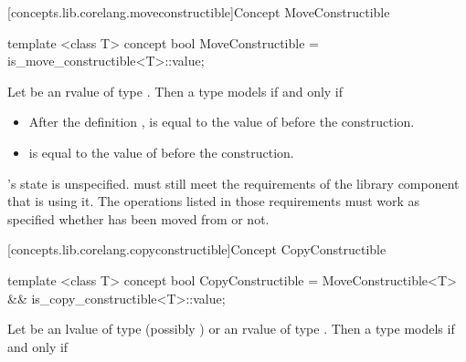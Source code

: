 \begin{addedblock}
\begin{itemdescr}
\end{itemdescr}

[concepts.lib.corelang.moveconstructible]{Concept MoveConstructible}

%
\begin{itemdecl}
template <class T>
concept bool MoveConstructible =
  is_move_constructible<T>::value;
\end{itemdecl}

\begin{itemdescr}
\pnum
Let  be an rvalue of type . Then a type  models
 if and only if

\begin{itemize}
\item After the definition ,  is equal to the value of
 before the construction.
\item {} is equal to the value of  before the construction.
\end{itemize}

\pnum
{}'s state is unspecified. \enternote {} must still meet the
requirements of the library component that is using it. The operations listed
in those requirements must work as specified whether  has been moved
from or not.\exitnote
\end{itemdescr}

[concepts.lib.corelang.copyconstructible]{Concept CopyConstructible}

%
\begin{itemdecl}
template <class T>
concept bool CopyConstructible =
  MoveConstructible<T> && is_copy_constructible<T>::value;
\end{itemdecl}

\begin{itemdescr}
\pnum
Let  be an lvalue of type (possibly )  or an rvalue
of type . Then a type  models  if
and only if


\end{itemdescr}
\end{addedblock}
